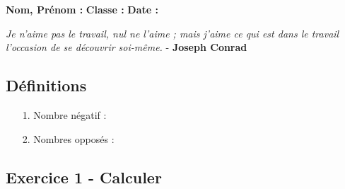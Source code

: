 \newpage

\textbf{Nom, Prénom :} \hspace{8cm} \textbf{Classe :} \hspace{3cm} \textbf{Date :}\\
\vspace{-0.8cm}
\begin{center}
  \textit{Je n'aime pas le travail, nul ne l'aime ; mais j'aime ce qui est dans le travail l'occasion de se découvrir soi-même.}  - \textbf{Joseph Conrad}
\end{center}
\vspace{-0.8cm}

\subsection*{Définitions}
  \begin{enumerate}
    \item[1.] Nombre négatif : \dotfill \\
    \Pointilles[1]
    \item[2.] Nombres opposés : \dotfill \\
    \Pointilles[1]
  \end{enumerate}

\subsection*{Exercice 1 - Calculer}

